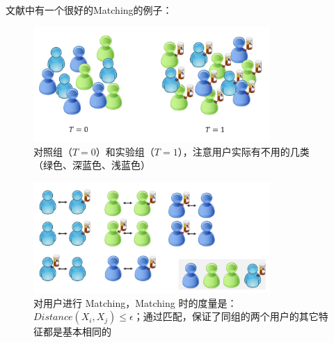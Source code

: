 \documentclass[12pt]{article}
\begin{document}
文献\cite{Causal_Inference_and_Stable_Learning}中有一个很好的Matching的例子：
\begin{figure}[H]
    \centering
    \caption*{对照组（$T=0$）和实验组（$T=1$），注意用户实际有不用的几类（绿色、深蓝色、浅蓝色）}
    \includegraphics[width=0.8\textwidth]{fig/Causal_Inference_and_Stable_Learning-Matching-1.png}
\end{figure}

\begin{figure}[H]
    \centering
    \caption*{对用户进行 Matching，Matching 时的度量是：$Distance(X_i, X_j) \le \epsilon$；通过匹配，保证了同组的两个用户的其它特征都是基本相同的}
    \includegraphics[width=0.8\textwidth]{fig/Causal_Inference_and_Stable_Learning-Matching-2.png}
\end{figure}




\end{document}
